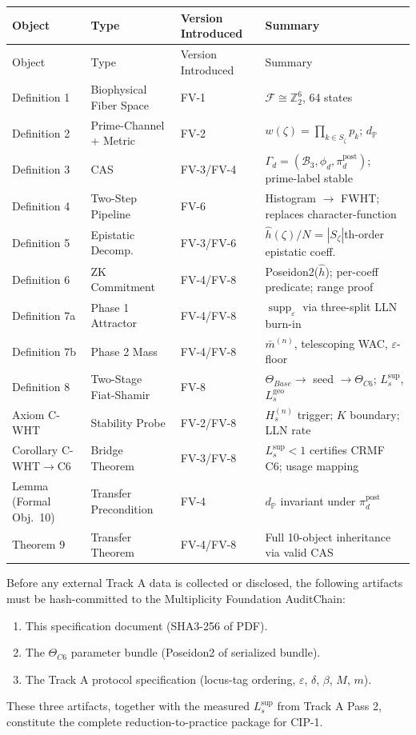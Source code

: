\documentclass[12pt,letterpaper]{article}
\theoremstyle{definition}
\theoremstyle{plain}
\theoremstyle{remark}
\newcommand{\supp}{\operatorname{supp}}
\newcommand{\dP}{d_{\mathbb{P}}}
\newcommand{\Tbase}{\Theta_{Base}}
\newcommand{\TC}{\Theta_{C6}}
\newcommand{\hhat}{\hat{h}}
\newcommand{\mbar}{\bar{m}}
\newcommand{\Lsup}{L_s^{\sup}}
\newcommand{\Lgeo}{L_s^{\mathrm{geo}}}
\begin{document}
\begin{longtable}{lllp{5.5cm}}
\toprule
Object & Type & Version Introduced & Summary \\
\midrule
\endfirsthead
\toprule
Object & Type & Version Introduced & Summary \\
\midrule
\endhead
Definition 1 & Biophysical Fiber Space & FV-1 & $\mathcal{F} \cong \mathbb{Z}_2^6$, 64 states \\
Definition 2 & Prime-Channel + Metric & FV-2 & $w(\zeta) = \prod_{k \in S_\zeta} p_k$; $\dP$ \\
Definition 3 & CAS & FV-3/FV-4 & $\Gamma_d = (\mathcal{B}_3, \phi_d, \pi_d^{\mathrm{post}})$; prime-label stable \\
Definition 4 & Two-Step Pipeline & FV-6 & Histogram $\to$ FWHT; replaces character-function \\
Definition 5 & Epistatic Decomp. & FV-3/FV-6 & $\hhat(\zeta)/N$ = $|S_\zeta|$th-order epistatic coeff. \\
Definition 6 & ZK Commitment & FV-4/FV-8 & Poseidon2($\hhat$); per-coeff predicate; range proof \\
Definition 7a & Phase 1 Attractor & FV-4/FV-8 & $\supp_\varepsilon$ via three-split LLN burn-in \\
Definition 7b & Phase 2 Mass & FV-4/FV-8 & $\mbar^{(n)}$, telescoping WAC, $\varepsilon$-floor \\
Definition 8 & Two-Stage Fiat-Shamir & FV-8 & $\Tbase \to$ seed $\to \TC$; $\Lsup$, $\Lgeo$ \\
Axiom C-WHT & Stability Probe & FV-2/FV-8 & $H_s^{(n)}$ trigger; $K$ boundary; LLN rate \\
Corollary C-WHT$\to$C6 & Bridge Theorem & FV-3/FV-8 & $\Lsup < 1$ certifies CRMF C6; usage mapping \\
Lemma (Formal Obj.\ 10) & Transfer Precondition & FV-4 & $\dP$ invariant under $\pi_d^{\mathrm{post}}$ \\
Theorem 9 & Transfer Theorem & FV-4/FV-8 & Full 10-object inheritance via valid CAS \\
\bottomrule
\end{longtable}

\medskip

\begin{claimbox}
Before any external Track A data is collected or disclosed, the following artifacts must be hash-committed to the Multiplicity Foundation AuditChain:
\begin{enumerate}
  \item This specification document (SHA3-256 of PDF).
  \item The $\TC$ parameter bundle (Poseidon2 of serialized bundle).
  \item The Track A protocol specification (locus-tag ordering, $\varepsilon$, $\delta$, $\beta$, $M$, $m$).
\end{enumerate}
These three artifacts, together with the measured $\Lsup$ from Track A Pass 2, constitute the complete reduction-to-practice package for CIP-1.
\end{claimbox}
\end{document}
